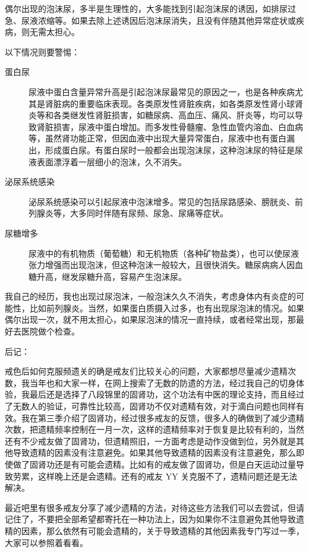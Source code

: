 \documentclass[fontset=founder]{ctexart}
\begin{document}
偶尔出现的泡沫尿，多半是生理性的，大多能找到引起泡沫尿的诱因，如排尿过急、尿液浓缩等。如果去除上述诱因后泡沫尿消失，且没有伴随其他异常症状或疾病，则无需太担心。

以下情况则要警惕：

\begin{description}
    \item[蛋白尿] 尿液中蛋白含量异常升高是引起泡沫尿最常见的原因之一，也是各种疾病尤其是肾脏病的重要临床表现。各类原发性肾脏疾病，如各类原发性肾小球肾炎等和各类继发性肾脏损害，如糖尿病、高血压、痛风、肝炎等，均可以导致肾脏损害，尿液中蛋白增加。而多发性骨髓瘤、急性血管内溶血、白血病等，虽然肾功能正常，但因血液中出现大量异常蛋白，尿液中也有蛋白漏出，形成蛋白尿。有蛋白尿时一般都会出现泡沫尿，这种泡沫尿的特征是尿液表面漂浮着一层细小的泡沫，久不消失。
    \item[泌尿系统感染] 泌尿系统感染可以引起尿液中泡沫增多。常见的包括尿路感染、膀胱炎、前列腺炎等，大多同时伴随有尿频、尿急、尿痛等症状。
    \item[尿糖增多] 尿液中的有机物质（葡萄糖）和无机物质（各种矿物盐类），也可以使尿液张力增强而出现泡沫，但这种泡沫一般较大，且很快消失。糖尿病病人因血糖升高，继发尿糖升高，容易产生泡沫尿。
\end{description}

我自己的经历，我也出现过尿泡沫，一般泡沫久久不消失，考虑身体内有炎症的可能性，比如前列腺炎。当然，如果蛋白质摄入过多，也有出现尿泡沫的情况。如果偶尔出现一次，就不用太担心，如果尿泡沫的情况一直持续，或者经常出现，那最好去医院做个检查。

后记：

戒色后如何克服频遗关的确是戒友们比较关心的问题，大家都想尽量减少遗精次数，我当年也和大家一样，在网上搜索了无数的防遗的方法，经过我自己的切身体验，我最后还是选择了八段锦里的固肾功，这个功法有中医的理论支持，而且经过了无数人的验证，可靠性比较高，固肾功不仅对遗精有效，对于滴白问题也同样有效。我在第三季介绍了固肾功，经过很多戒友的反馈，很多人的确做到了减少遗精次数，把遗精频率控制在一月一次，这样的遗精频率对于恢复是比较有利的，当然还有不少戒友做了固肾功，但遗精照旧，一方面考虑是动作没做到位，另外就是其他导致遗精的因素没有注意避免。如果其他导致遗精的因素没有注意避免，那么即使做了固肾功还是有可能会遗精。比如有的戒友做了固肾功，但是白天运动过量导致劳累，这样晚上还是会遗精。还有的戒友 YY 关克服不了，遗精问题还是无法解决。

最近吧里有很多戒友分享了减少遗精的方法，对待这些方法我们可以去尝试，但请记住了，不要把全部希望都寄托在一种功法上，因为如果你不注意避免其他导致遗精的因素，那么依然有可能会遗精的，关于导致遗精的其他因素我专门写过一季，大家可以参照着看看。
\end{document}
